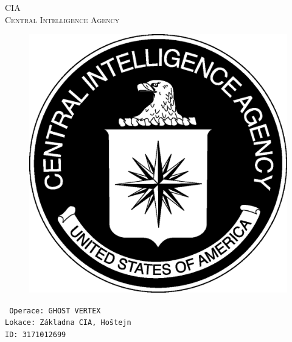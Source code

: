 \documentclass[a4paper, \fontheight]{article}
\begin{document}
	\begin{titlepage}
		\begin{center}		
			\textsc{{\fontsize{80}{0}\selectfont CIA}\\[2em]
				\Huge Central Intelligence Agency\\[2.5em]}
				
			\begin{figure}[H]
				\centering
				\includegraphics[scale=0.6]{sources/CIA_logo.eps}
			\end{figure}
		\end{center}	
		\vfill
		\noindent
		\texttt{\LARGE
				Operace: GHOST VERTEX\\[0.4em]
				Lokace: Základna CIA, Hoštejn\\[0.4em]
				ID: 3171012699}	
\end{titlepage} 
\end{document}
